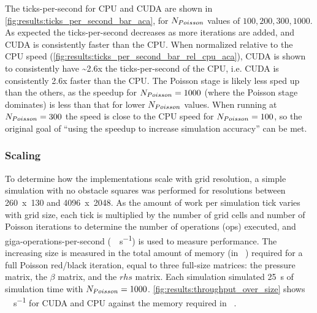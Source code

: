 


The ticks-per-second for CPU and CUDA are shown in \cref{fig:results:ticks_per_second_bar_aca}, for $N_{Poisson}$ values of ${100, 200, 300, 1000}$.
As expected the ticks-per-second decreases as more iterations are added, and CUDA is consistently faster than the CPU.
When normalized relative to the CPU speed (\cref{fig:results:ticks_per_second_bar_rel_cpu_aca}), CUDA is shown to consistently have \textasciitilde{}2.6x the ticks-per-second of the CPU, i.e. CUDA is consistently 2.6x faster than the CPU. 
The Poisson stage is likely less sped up than the others, as the speedup for $N_{Poisson}{} = 1000$ (where the Poisson stage dominates) is less than that for lower $N_{Poisson}{}$ values.
When running at $N_{Poisson}{} = 300$ the speed is close to the CPU speed for $N_{Poisson} = 100$, so the original goal of ``using the speedup to increase simulation accuracy'' can be met.

\subsubsection{Scaling}
To determine how the implementations scale with grid resolution, a simple simulation with no obstacle squares was performed for resolutions between 260~x~130 and 4096~x~2048.
As the amount of work per simulation tick varies with grid size, each tick is multiplied by the number of grid cells and number of Poisson iterations to determine the number of operations (\si{op}s) executed, and giga-operations-per-second (\si{\giga\op\per\second}) is used to measure performance.
The increasing size is measured in the total amount of memory (in \si{\mega\byte}) required for a full Poisson red/black iteration, equal to three full-size matrices: the pressure matrix, the $\beta$ matrix, and the $rhs$ matrix.
Each simulation simulated \SI{25}{\second} of simulation time with $N_{Poisson}{} = 1000$.
\cref{fig:results:throughput_over_size} shows \si{\giga\op\per\second} for CUDA and CPU against the memory required in \si{\mega\byte}.




\pagebreak


